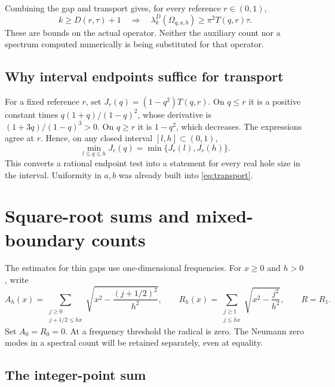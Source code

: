 \documentclass[11pt,reqno]{amsart}
\numberwithin{equation}{section}
\newcommand{\Om}{\Omega}
\begin{document}
Combining the gap and transport gives, for every reference
$r\in(0,1)$,
\begin{equation}\label{eq:indexed-gap}
 k\ge D(r,\tau)+1
 \quad\Longrightarrow\quad
 \lambda_k^D(\Om_{q,a,b})\ge\pi^2T(q,r)\tau.
\end{equation}
These are bounds on the actual operator. Neither the auxiliary
count nor a spectrum computed numerically is being substituted
for that operator.

\subsection*{Why interval endpoints suffice for transport}

For a fixed reference $r$, set $J_r(q)=(1-q^2)T(q,r)$.
On $q\le r$ it is a positive constant times
$q(1+q)/(1-q)^2$, whose derivative is
$(1+3q)/(1-q)^3>0$. On $q\ge r$ it is $1-q^2$, which
decreases. The expressions agree at $r$. Hence, on any closed
interval $[l,h]\subset(0,1)$,
\begin{equation}\label{eq:endpoint-minimum}
 \min_{l\le q\le h}J_r(q)=\min\{J_r(l),J_r(h)\}.
\end{equation}
This converts a rational endpoint test into a statement for
every real hole size in the interval. Uniformity in $a,b$
was already built into \eqref{eq:transport}.

\section{Square-root sums and mixed-boundary counts}\label{sec:sums}

The estimates for thin gaps use one-dimensional frequencies.
For $x\ge0$ and $h>0$, write
\begin{equation}\label{eq:rect-width-sums}
 A_h(x)=\sum_{\substack{j\ge0\\j+1/2\le hx}}
    \sqrt{x^2-\frac{(j+1/2)^2}{h^2}},\qquad
 R_h(x)=\sum_{\substack{j\ge1\\j\le hx}}
    \sqrt{x^2-\frac{j^2}{h^2}},\qquad R=R_1.
\end{equation}
Set $A_0=R_0=0$. At a frequency threshold the radical is
zero. The Neumann zero modes in a spectral count will be
retained separately, even at equality.

\subsection*{The integer-point sum}
\end{document}

